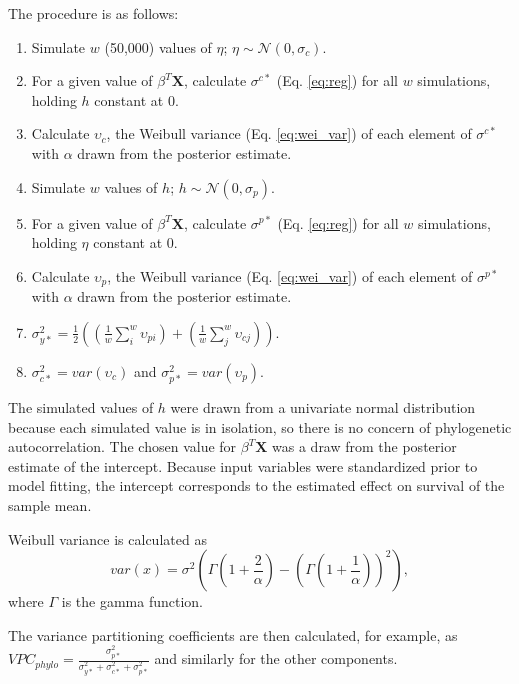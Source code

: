 \documentclass{article}
\begin{document}
The procedure is as follows:
\begin{enumerate}
  \item Simulate \(w\) (50,000) values of \(\eta\); \(\eta \sim \mathcal{N}(0, \sigma_{c})\).
  \item For a given value of \(\beta^{T} \mathbf{X}\), calculate \(\sigma^{c*}\) (Eq. \ref{eq:reg}) for all \(w\) simulations, holding \(h\) constant at 0.
  \item Calculate \(\upsilon_{c}\), the Weibull variance (Eq. \ref{eq:wei_var}) of each element of \(\sigma^{c*}\) with \(\alpha\) drawn from the posterior estimate.
  \item Simulate \(w\) values of \(h\); \(h \sim \mathcal{N}(0, \sigma_{p})\). 
  \item For a given value of \(\beta^{T} \mathbf{X}\), calculate \(\sigma^{p*}\) (Eq. \ref{eq:reg}) for all \(w\) simulations, holding \(\eta\) constant at 0.
  \item Calculate \(\upsilon_{p}\), the Weibull variance (Eq. \ref{eq:wei_var}) of each element of \(\sigma^{p*}\) with \(\alpha\) drawn from the posterior estimate.
  \item \(\sigma_{y*}^{2} = \frac{1}{2} \left(\left(\frac{1}{w} \sum_{i}^{w} \upsilon_{pi}\right) + \left(\frac{1}{w} \sum_{j}^{w} \upsilon_{cj}\right)\right)\).
  \item \(\sigma_{c*}^{2} = var(\upsilon_{c})\) and \(\sigma_{p*}^{2} = var(\upsilon_{p})\).
\end{enumerate}

The simulated values of \(h\) were drawn from a univariate normal distribution because each simulated value is in isolation, so there is no concern of phylogenetic autocorrelation. The chosen value for \(\beta^{T} \mathbf{X}\) was a draw from the posterior estimate of the intercept. Because input variables were standardized prior to model fitting, the intercept corresponds to the estimated effect on survival of the sample mean.

Weibull variance is calculated as
\begin{equation}
  var(x) = \sigma^{2}\left(\Gamma\left(1 + \frac{2}{\alpha}\right) - \left(\Gamma\left(1 + \frac{1}{\alpha}\right)\right)^{2}\right),
  \label{eq:wei_var}
\end{equation}
where \(\Gamma\) is the gamma function. 

The variance partitioning coefficients are then calculated, for example, as \(VPC_{phylo} = \frac{\sigma_{p*}^{2}}{\sigma_{y*}^{2} + \sigma_{c*}^{2} + \sigma_{p*}^{2}}\) and similarly for the other components.
\end{document}
